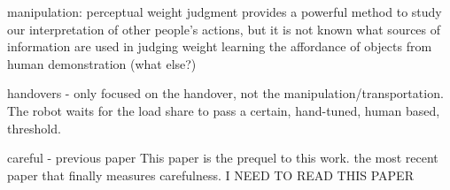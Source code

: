 manipulation:
\cite{hamilton_kinematic_2007} perceptual weight judgment provides a powerful method to study our interpretation of other people's actions, but it is not known what sources of information are used in judging weight
\cite{kjellstrom_visual_2011} learning the affordance of objects from human demonstration (what else?)

handovers - 
\cite{Medina2016} only focused on the handover, not the manipulation/transportation. The robot waits for the load share to pass a certain, hand-tuned, human based, threshold.

careful - 
previous paper \cite{duarte_human_2020} This paper is the prequel to this work.
\cite{lastrico_careful_2021} the most recent paper that finally measures carefulness. I NEED TO READ THIS PAPER
 

